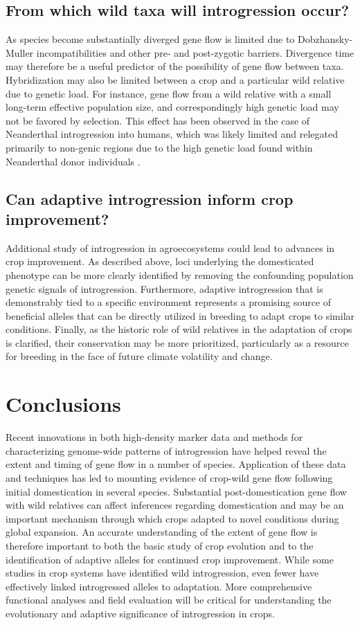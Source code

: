 \documentclass[11pt]{article}
\begin{document}
\subsection*{From which wild taxa will introgression occur?}
As species become substantially diverged gene flow is limited due to Dobzhansky-Muller incompatibilities and other pre- and post-zygotic barriers.
Divergence time may therefore be a useful predictor of the possibility of gene flow between taxa.
Hybridization may also be limited between a crop and a particular wild relative due to genetic load. 
For instance, gene flow from a wild relative with a small long-term effective population size, and correspondingly high genetic load may not be favored by selection.
This effect has been observed in the case of Neanderthal introgression into humans, which was likely limited and relegated primarily to non-genic regions due to the high genetic load found within Neanderthal donor individuals \citep{harris2016genetic}.

\subsection*{Can adaptive introgression inform crop improvement?}

Additional study of introgression in agroecosystems could lead to advances in crop improvement.
As described above, loci underlying the domesticated phenotype can be more clearly identified by removing the confounding population genetic signals of introgression.
Furthermore, adaptive introgression that is demonstrably tied to a specific environment represents a promising source of beneficial alleles that can be directly utilized in breeding to adapt crops to similar conditions.
Finally, as the historic role of wild relatives in the adaptation of crops is clarified, their conservation may be more prioritized, particularly as a resource for breeding in the face of future climate volatility and change.

\section*{Conclusions}

Recent innovations in both high-density marker data and methods for characterizing genome-wide patterns of introgression have helped reveal the extent and timing of gene flow in a number of species.
Application of these data and techniques has led to mounting evidence of crop-wild gene flow following initial domestication in several species.
Substantial post-domestication gene flow with wild relatives can affect inferences regarding domestication and may be an important mechanism through which crops adapted to novel conditions during global expansion.
An accurate understanding of the extent of gene flow is therefore important to both the basic study of crop evolution and to the identification of adaptive alleles for continued crop improvement.
While some studies in crop systems have identified wild introgression, even fewer have effectively linked introgressed alleles to adaptation.
More comprehensive functional analyses and field evaluation will be critical for understanding the evolutionary and adaptive significance of introgression in crops.
\end{document}
